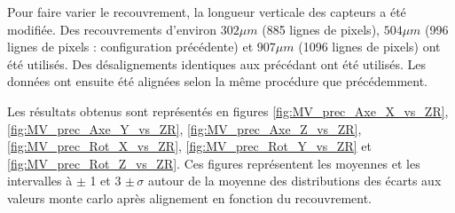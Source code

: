    \medskip
   
   Pour faire varier le recouvrement, la longueur verticale des capteurs a \'et\'e modifi\'ee. Des recouvrements d'environ $302 \mu m$ (885 lignes de pixels), $504 \mu m$ (996 lignes de pixels : configuration pr\'ec\'edente) et $907 \mu m$ (1096 lignes de pixels) ont \'et\'e utilis\'es. Des d\'esalignements identiques aux pr\'ec\'edant ont \'et\'e utilis\'es. Les donn\'ees ont ensuite \'et\'e align\'ees selon la m\^eme procédure que pr\'ec\'edemment.
   
   \medskip
   
%    
   
   Les r\'esultats obtenus sont repr\'esent\'es en figures \ref{fig:MV_prec_Axe_X_vs_ZR}, \ref{fig:MV_prec_Axe_Y_vs_ZR}, \ref{fig:MV_prec_Axe_Z_vs_ZR}, \ref{fig:MV_prec_Rot_X_vs_ZR}, \ref{fig:MV_prec_Rot_Y_vs_ZR} et \ref{fig:MV_prec_Rot_Z_vs_ZR}. Ces figures repr\'esentent les moyennes et les intervalles \`a $\pm$ 1 et 3 $\pm \, \sigma$ autour de la moyenne des distributions des \'ecarts aux valeurs monte carlo apr\`es alignement en fonction du recouvrement. 
   
